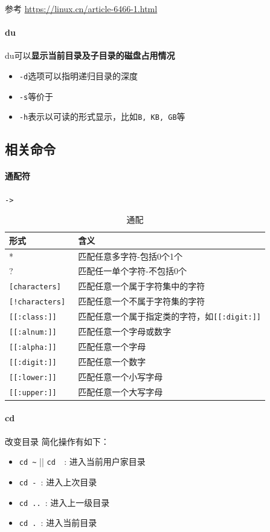 \documentclass[UTF8,a4paper,12pt]{ctexbook}
\newcommand{\erhao}{\fontsize{21pt}{\baselineskip}\selectfont}
\begin{document}
			 参考 \url{https://linux.cn/article-6466-1.html}
			\paragraph{du}du可以\textbf{显示当前目录及子目录的磁盘占用情况}
				\begin{itemize}
					\item \verb|-d|选项可以指明递归目录的深度
					\item \verb|-s|等价于\erhao
					\item \verb|-h|表示以可读的形式显示，比如\verb|B, KB, GB|等
				\end{itemize}
		
		\subsection{相关命令}
		\paragraph{通配符}\verb|->|
			\begin{table}[H]
				\centering
				\caption{通配}
				\begin{tabular}{l|m{14cm}}
					\hline
						形式 	   	   & 含义\\
					\hline
						*			 & 匹配任意多字符-包括0个1个\\
						?			& 匹配任一单个字符-不包括0个\\
						\verb|[characters]	|	& 匹配任意一个属于字符集中的字符\\
						\verb|[!characters] |		& 匹配任意一个不属于字符集的字符\\
						\verb|[[:class:]]   |		& 匹配任意一个属于指定类的字符，如\verb|[[:digit:]]|\\
						\verb|[[:alnum:]]	|		& 匹配任意一个字母或数字\\
						\verb|[[:alpha:]]	|		& 匹配任意一个字母\\
						\verb|[[:digit:]]	|		& 匹配任意一个数字\\
						\verb|[[:lower:]]	|		& 匹配任意一个小写字母\\
						\verb|[[:upper:]]	|		& 匹配任意一个大写字母\\
					\hline
				\end{tabular}
			\end{table}
		\paragraph{cd} 改变目录
			简化操作有如下：
			\begin{itemize}[itemindent  = 1em]
				\item \verb|cd ~| || \verb|cd  |: 进入当前用户家目录
				\item \verb|cd - |: 进入上次目录
				\item \verb|cd .. |: 进入上一级目录
				\item \verb|cd . |: 进入当前目录
			\end{itemize}
\end{document}
